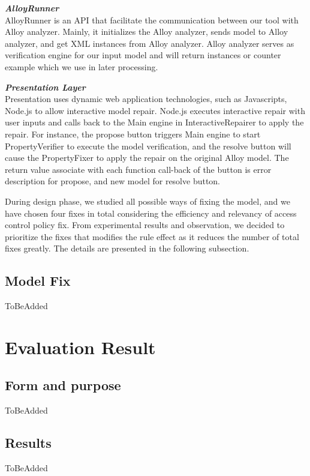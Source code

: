 \documentclass{acm_proc_article-sp}
\begin{document}
\textbf{\emph{AlloyRunner}}\\
AlloyRunner is an API that facilitate the communication between our tool with Alloy analyzer. Mainly, it initializes the Alloy analyzer, sends model to Alloy analyzer, and get XML instances from Alloy analyzer. Alloy analyzer serves as verification engine for our input model and will return instances or counter example which we use in later processing.

\textbf{\emph{Presentation Layer}}\\
Presentation uses dynamic web application technologies, such as Javascripts, Node.js to allow interactive model repair. Node.js executes interactive repair with user inputs and calls back to the Main engine in InteractiveRepairer to apply the repair. For instance, the propose button triggers Main engine to start PropertyVerifier to execute the model verification, and the resolve button will cause the PropertyFixer to apply the repair on the original Alloy model. The return value associate with each function call-back of the button is error description for propose, and new model for resolve button.


During design phase, we studied all possible ways of fixing the model, and we have chosen four fixes in total considering the efficiency and relevancy of access control policy fix. From experimental results and observation, we decided to prioritize the fixes that modifies the rule effect as it reduces the number of total fixes greatly. The details are presented in the following subsection. 

\subsection{Model Fix}

ToBeAdded

\section{Evaluation Result}

\subsection{Form and purpose}

ToBeAdded

\subsection{Results}
ToBeAdded
\end{document}
